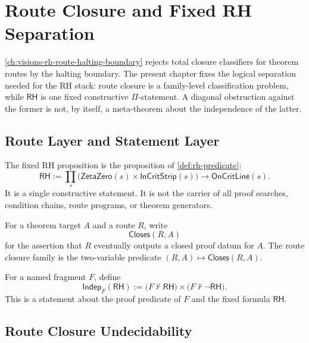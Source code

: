 \chapter{Route Closure and Fixed RH Separation}
\label{ch:visions-rh-route-closure-fixed-statement-separation}

\autoref{ch:visions-rh-route-halting-boundary} rejects total closure
classifiers for theorem routes by the halting boundary. The present chapter
fixes the logical separation needed for the RH stack: route closure is a
family-level classification problem, while $\mathsf{RH}$ is one fixed
constructive $\Pi$-statement. A diagonal obstruction against the former is
not, by itself, a meta-theorem about the independence of the latter.

\section{Route Layer and Statement Layer}
\label{sec:rh-route-fixed-layer-separation}

\begin{definition}
\label{def:rh-fixed-proposition-separation}
The fixed RH proposition is the proposition of \autoref{def:rh-predicate}:
$$
\mathsf{RH}
:=
\prod_s
\bigl(
\mathsf{ZetaZero}(s)\times\mathsf{InCritStrip}(s)
\bigr)
\to
\mathsf{OnCritLine}(s).
$$
It is a single constructive statement. It is not the carrier of all proof
searches, condition chains, route programs, or theorem generators.
\end{definition}

\begin{definition}
\label{def:rh-route-closure-family}
For a theorem target $A$ and a route $R$, write
$$
\mathsf{Closes}(R,A)
$$
for the assertion that $R$ eventually outputs a closed proof datum for
$A$. The route closure family is the two-variable predicate
$(R,A)\mapsto\mathsf{Closes}(R,A)$.
\end{definition}

\begin{definition}
\label{def:rh-fragment-independence}
For a named fragment $F$, define
$$
\mathsf{Indep}_{F}(\mathsf{RH})
:=
\bigl(F\not\vdash\mathsf{RH}\bigr)
\times
\bigl(F\not\vdash\neg\mathsf{RH}\bigr).
$$
This is a statement about the proof predicate of $F$ and the fixed formula
$\mathsf{RH}$.
\end{definition}

\section{Route Closure Undecidability}
\label{sec:rh-route-closure-undecidability}

